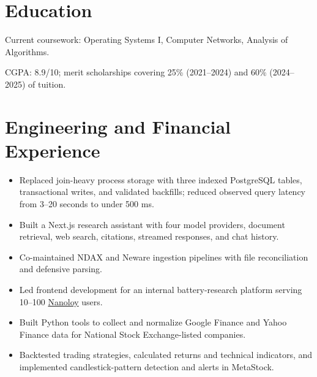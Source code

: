 

\resumeheader
\section{Education}
Current coursework: Operating Systems I, Computer Networks, Analysis of Algorithms.\par
\vspace{3pt}
CGPA: 8.9/10; merit scholarships covering 25\% (2021--2024) and 60\% (2024--2025) of tuition.
\section{Engineering and Financial Experience}
\begin{itemize}
  \item Replaced join-heavy process storage with three indexed PostgreSQL tables, transactional writes, and validated backfills; reduced observed query latency from 3--20 seconds to under 500 ms.
  \item Built a Next.js research assistant with four model providers, document retrieval, web search, citations, streamed responses, and chat history.
  \item Co-maintained NDAX and Neware ingestion pipelines with file reconciliation and defensive parsing.
  \item Led frontend development for an internal battery-research platform serving 10--100 \href{https://www.nanoloy.com}{Nanoloy} users.
\end{itemize}
\begin{itemize}
  \item Built Python tools to collect and normalize Google Finance and Yahoo Finance data for National Stock Exchange-listed companies.
  \item Backtested trading strategies, calculated returns and technical indicators, and implemented candlestick-pattern detection and alerts in MetaStock.
\end{itemize}
